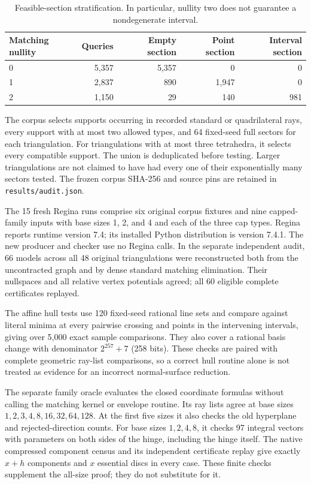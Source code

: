 \begin{table}[ht]
\centering
\begin{tabular}{@{}lrrrr@{}}
\toprule
Matching nullity & Queries & Empty section & Point section & Interval section\\
\midrule
0 & 5,357 & 5,357 & 0 & 0\\
1 & 2,837 & 890 & 1,947 & 0\\
2 & 1,150 & 29 & 140 & 981\\
\bottomrule
\end{tabular}
\caption{Feasible-section stratification. In particular, nullity two does
not guarantee a nondegenerate interval.}
\end{table}

The corpus selects supports occurring in recorded standard or quadrilateral
rays, every support with at most two allowed types, and 64 fixed-seed full
sectors for each triangulation. For triangulations with at most three
tetrahedra, it selects every compatible support. The union is deduplicated
before testing. Larger triangulations are not claimed to have had every one
of their exponentially many sectors tested. The frozen corpus SHA-256 and
source pins are retained in \texttt{results/audit.json}.

The 15 fresh Regina runs comprise six original corpus fixtures and nine
capped-family inputs with base sizes 1, 2, and 4 and each of the three cap
types. Regina reports runtime version 7.4; its installed Python distribution
is version 7.4.1.\cite{regina} The new producer and checker use no Regina
calls. In the separate independent audit, 66 models across all 48 original
triangulations were reconstructed both from the uncontracted graph and by
dense standard matching elimination. Their nullspaces and all relative
vertex potentials agreed; all 60 eligible complete certificates replayed.

The affine hull tests use 120 fixed-seed rational line sets and compare
against literal minima at every pairwise crossing and points in the intervening
intervals, giving over 5,000 exact sample comparisons. They also cover
a rational basis change with denominator $2^{257}+7$ (258 bits). These checks are paired with complete
geometric ray-list comparisons, so a correct hull routine alone is not
treated as evidence for an incorrect normal-surface reduction.

The separate family oracle evaluates the closed coordinate formulas without
calling the matching kernel or envelope routine. Its ray lists agree at
base sizes $1,2,3,4,8,16,32,64,128$. At the first five sizes it also checks
the old hyperplane and rejected-direction counts. For base sizes
$1,2,4,8$, it checks 97 integral vectors with parameters on both sides of
the hinge, including the hinge itself. The native compressed component
census and its independent certificate replay give exactly $x+h$ components
and $x$ essential discs in every case. These finite checks supplement the
all-size proof; they do not substitute for it.
